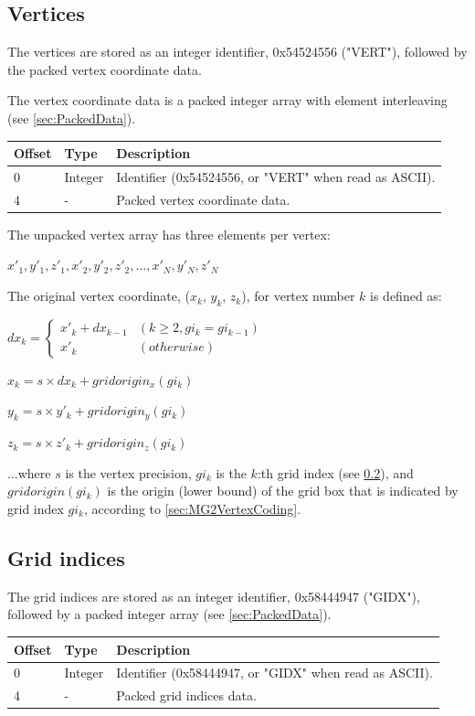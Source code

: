 \subsection{Vertices}
The vertices are stored as an integer identifier, 0x54524556 ("VERT"), followed
by the packed vertex coordinate data.

The vertex coordinate data is a packed integer array with element interleaving
(see \ref{sec:PackedData}).

\begin{tabular}{|l|l|l|}\hline
\textbf{Offset} &  \textbf{Type} & \textbf{Description}\\ \hline
0 & Integer & Identifier (0x54524556, or "VERT" when read as ASCII).\\ \hline
4 & - & Packed vertex coordinate data.\\ \hline
\end{tabular}

The unpacked vertex array has three elements per vertex:

$x'_1, y'_1, z'_1, x'_2, y'_2, z'_2, ..., x'_N, y'_N, z'_N$

The original vertex coordinate, ($x_k$, $y_k$, $z_k$), for vertex number $k$ is defined as:

$dx_k = \begin{cases}
x'_k + dx_{k-1} & (k \geq 2, gi_k = gi_{k-1})\\
x'_k & (otherwise)
\end{cases}$

$x_k = s \times dx_k + gridorigin_x(gi_k)$

$y_k = s \times y'_k + gridorigin_y(gi_k)$

$z_k = s \times z'_k + gridorigin_z(gi_k)$

...where $s$ is the vertex precision, $gi_k$ is the $k$:th grid index (see \ref{sec:GridIndices}),
and $gridorigin(gi_k)$ is the origin (lower bound) of the grid box that is indicated by
grid index $gi_k$, according to \ref{sec:MG2VertexCoding}.



\subsection{Grid indices}
\label{sec:GridIndices}
The grid indices are stored as an integer identifier, 0x58444947 ("GIDX"), followed
by a packed integer array (see \ref{sec:PackedData}).

\begin{tabular}{|l|l|l|}\hline
\textbf{Offset} &  \textbf{Type} & \textbf{Description}\\ \hline
0 & Integer & Identifier (0x58444947, or "GIDX" when read as ASCII).\\ \hline
4 & - & Packed grid indices data.\\ \hline
\end{tabular}

